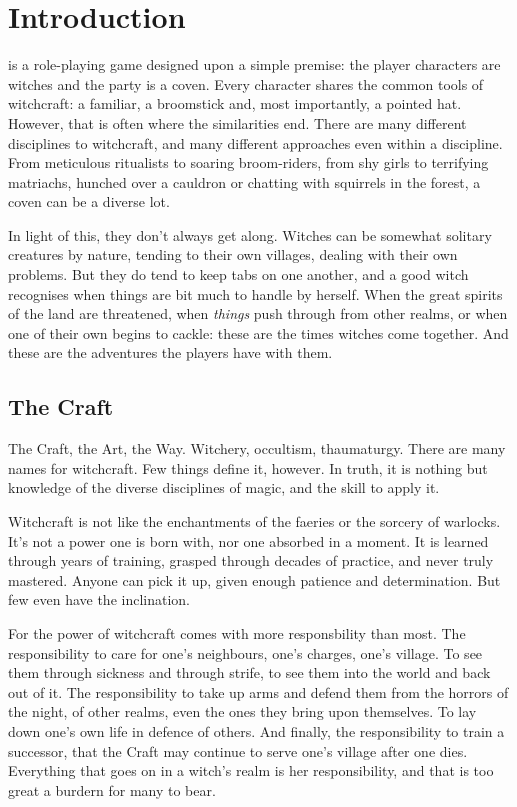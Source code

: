 \chapter{Introduction}

 is a role-playing game designed upon a simple premise: the player characters are witches and the party is a coven.
Every character shares the common tools of witchcraft: a familiar, a broomstick and, most importantly, a pointed hat.
However, that is often where the similarities end.
There are many different disciplines to witchcraft, and many different approaches even within a discipline.
From meticulous ritualists to soaring broom-riders, from shy girls to terrifying matriachs, hunched over a cauldron or chatting with squirrels in the forest, a coven can be a diverse lot.

In light of this, they don't always get along.
Witches can be somewhat solitary creatures by nature, tending to their own villages, dealing with their own problems.
But they do tend to keep tabs on one another, and a good witch recognises when things are bit much to handle by herself.
When the great spirits of the land are threatened, when \emph{things} push through from other realms, or when one of their own begins to cackle: these are the times witches come together.
And these are the adventures the players have with them.

\section{The Craft}

The Craft, the Art, the Way.
Witchery, occultism, thaumaturgy.
There are many names for witchcraft.
Few things define it, however.
In truth, it is nothing but knowledge of the diverse disciplines of magic, and the skill to apply it.

Witchcraft is not like the enchantments of the faeries or the sorcery of warlocks.
It's not a power one is born with, nor one absorbed in a moment.
It is learned through years of training, grasped through decades of practice, and never truly mastered.
Anyone can pick it up, given enough patience and determination.
But few even have the inclination.

For the power of witchcraft comes with more responsbility than most.
The responsibility to care for one's neighbours, one's charges, one's village.
To see them through sickness and through strife, to see them into the world and back out of it.
The responsibility to take up arms and defend them from the horrors of the night, of other realms, even the ones they bring upon themselves.
To lay down one's own life in defence of others.
And finally, the responsibility to train a successor, that the Craft may continue to serve one's village after one dies.
Everything that goes on in a witch's realm is her responsibility, and that is too great a burdern for many to bear.


